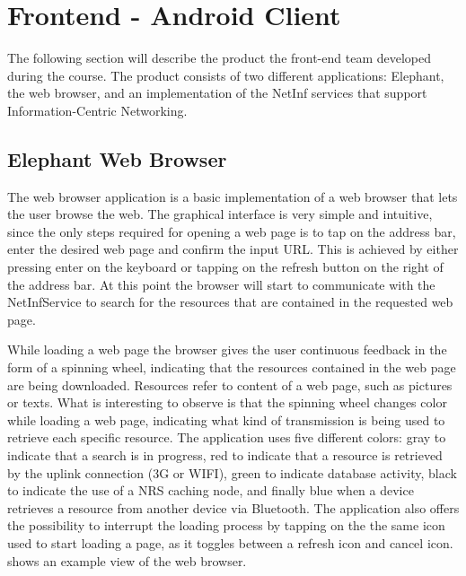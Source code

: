 \section {Frontend - Android Client}
The following section will describe the product the front-end team developed during the course.
The product consists of two different applications: Elephant, the web browser, and an implementation
of the NetInf services that support Information-Centric Networking.

\subsection{Elephant Web Browser}
\label{sec:Elephant Web Browser}
The web browser application is a basic implementation of a web browser that lets the user browse
the web. The graphical interface is very simple and intuitive, since the only steps required for
opening a web page is to tap on the address bar, enter the desired web page and confirm the input URL.
This is achieved by either pressing enter on the keyboard or tapping on the refresh button on the right
of the address bar. At this point the browser will start to communicate with the NetInfService to
search for the resources that are contained in the requested web page.

While loading a web page the browser gives the user continuous feedback in the form of a spinning wheel,
indicating that the resources contained in the web page are being downloaded.
Resources refer to content of a web page, such as pictures or texts.
What is interesting to observe is that the spinning wheel changes color while loading a web page,
indicating what kind of transmission is being used to retrieve each specific resource.
The application uses five different colors: gray to indicate that a search is in progress, red to indicate
that a resource is retrieved by the uplink connection (3G or WIFI), green to indicate database activity,
black to indicate the use of a NRS caching node, and finally blue when a device retrieves a resource from
another device via Bluetooth. The application also offers the possibility to interrupt the
loading process by tapping on the the same icon used to start loading a page, as it toggles between a refresh
icon and cancel icon.  shows an example view of the web browser.\\

